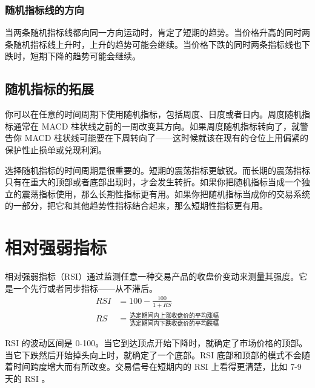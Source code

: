 \subsubsection*{随机指标线的方向}
当两条随机指标线都向同一方向运动时，肯定了短期的趋势。当价格升高的同时两条随机指标线上升时，上升的趋势可能会继续。当价格下跌的同时两条指标线也下跌时，短期下降的趋势可能会继续。
\subsection*{随机指标的拓展}
你可以在任意的时间周期下使用随机指标，包括周度、日度或者日内。周度随机指标通常在 MACD 柱状线之前的一周改变其方向。如果周度随机指标转向了，就警告你 MACD 柱状线可能要在下周转向了——这时候就该在现有的仓位上用偏紧的保护性止损单或兑现利润。

选择随机指标的时间周期是很重要的。短期的震荡指标更敏锐。而长期的震荡指标只有在重大的顶部或者底部出现时，才会发生转折。如果你把随机指标当成一个独立的震荡指标使用，那么长期性指标更有用。如果你把随机指标当成你的交易系统的一部分，把它和其他趋势性指标结合起来，那么短期性指标更有用。
\section{相对强弱指标}
相对强弱指标（RSI）通过监测任意一种交易产品的收盘价变动来测量其强度。它是一个先行或者同步指标——从不滞后。
\begin{equation}
    \begin{aligned}
        RSI & =100-\frac{100}{1+RS}                                  \\
        RS  & =\frac{\text{选定期间内上涨收盘价的平均涨幅}}{\text{选定期间内下跌收盘价的平均跌幅}}
    \end{aligned}
\end{equation}

RSI 的波动区间是 0-100。当它到达顶点开始下降时，就确定了市场价格的顶部。当它下跌然后开始掉头向上时，就确定了一个底部。RSI 底部和顶部的模式不会随着时间跨度增大而有所改变。交易信号在短期内的 RSI 上看得更清楚，比如 7-9 天的 RSI 。

